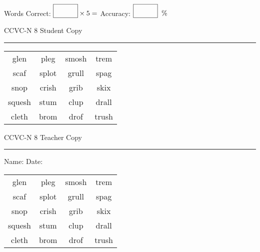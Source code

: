 \documentclass{memoir}
\begin{document}
\small

Words Correct: $\fbox{\phantom{\huge 100}} \times 5 = $ Accuracy: $\fbox{\phantom{\huge 100}}\;\; \%$ 

\vfill

\newpage


\footnotesize \noindent
CCVC-N 8 \hfill Student Copy
\smallskip
\hrule

\Large

\setlength{\tabcolsep}{14pt}
\def\arraystretch{3}

{\selectfont


\begin{vplace}[0.5]
\begin{center}
\begin{tabular}{cccc}
glen & pleg & smosh & trem \\
scaf & splot & grull            & spag          \\
snop & crish & grib     & skix \\
squesh & stum & clup & drall \\
cleth & brom          & drof & trush \\
\end{tabular}
\end{center}
\end{vplace}

}

\newpage

\footnotesize \noindent
CCVC-N 8 \hfill Teacher Copy
\smallskip
\hrule

\small

\vfill

\noindent
Name: \underline{\hspace{1.75in}} \hfill Date: \underline{\hspace{1in}}

\Large

{\selectfont


\begin{vplace}[0.5]
\begin{center}
\begin{tabular}{cccc}
glen & pleg & smosh & trem \\
scaf & splot & grull            & spag          \\
snop & crish & grib     & skix \\
squesh & stum & clup & drall \\
cleth & brom          & drof & trush \\
\end{tabular}
\end{center}
\end{vplace}



}
\end{document}
